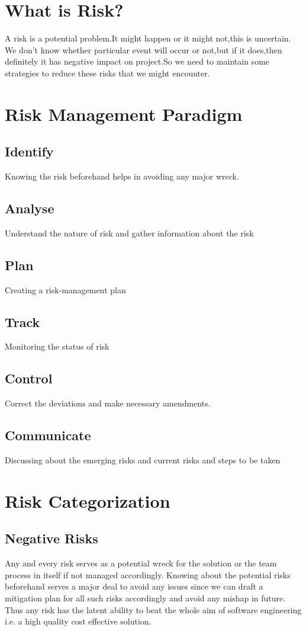 \documentclass[12pt]{article}
\begin{document}
\section{What is Risk?}
A risk is a potential problem.It might happen or it might not,this is uncertain.
We don’t know whether particular event will occur or not,but if it does,then definitely it has negative impact on project.So we need to maintain some strategies
to reduce these risks that we might encounter.

\section{Risk Management Paradigm}
\subsection{Identify}
Knowing the risk beforehand helps in avoiding any major wreck.
\subsection{Analyse}
Understand the nature of risk and gather information about the risk
\subsection{Plan}
Creating a risk-management plan
\subsection{Track}
Monitoring the status of risk
\subsection{Control}
Correct the deviations and make necessary amendments.
\subsection{Communicate}
Discussing about the emerging risks and current risks and steps to be taken
\section{ Risk Categorization}
\subsection{Negative Risks}
Any and every risk serves as a potential wreck for the solution or the team process in itself if not managed accordingly. Knowing about the potential risks beforehand serves a major deal to avoid any  issues since we can draft a mitigation plan for all such risks accordingly and avoid any mishap in future. 
\\
Thus any risk has the latent ability to beat the whole aim of software engineering i.e. a high quality cost effective solution.
\end{document}
